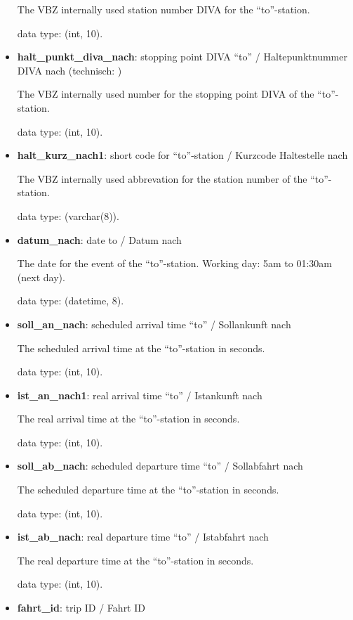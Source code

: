 \documentclass[11pt]{article}
\begin{document}
\begin{itemize}
	The VBZ internally used station number DIVA for the ``to''-station.
	
	data type: (int, 10).
	
	\item \textbf{halt\_punkt\_diva\_nach}: stopping point DIVA ``to'' / Haltepunktnummer DIVA nach (technisch: )
	
	The VBZ internally used number for the stopping point DIVA of the  ``to''-station.
	
	data type: (int, 10).
	
	\item \textbf{halt\_kurz\_nach1}: short code for ``to''-station / Kurzcode Haltestelle nach
	
	The VBZ internally used abbrevation for the station number of the ``to''-station.
	
	data type: (varchar(8)).
	
	\item \textbf{datum\_nach}: date to / Datum nach
	
	The date for the event of the  ``to''-station. Working day: 5am to 01:30am (next day).
	
	data type: (datetime, 8).
	
	\item \textbf{soll\_an\_nach}: scheduled arrival time ``to'' / Sollankunft nach
	
	The scheduled arrival time at the ``to''-station in seconds.
	
	data type: (int, 10).
	
	\item \textbf{ist\_an\_nach1}: real arrival time ``to'' / Istankunft nach
	
	The real arrival time at the ``to''-station in seconds.
	
	data type: (int, 10).
	
	\item \textbf{soll\_ab\_nach}: scheduled departure time ``to'' / Sollabfahrt nach
	
	The scheduled departure time at the ``to''-station in seconds.
	
	data type: (int, 10).
	
	\item \textbf{ist\_ab\_nach}: real departure time ``to'' / Istabfahrt nach
	
	The real departure time at the ``to''-station in seconds.
	
	data type: (int, 10).
	
	\item \textbf{fahrt\_id}: trip ID / Fahrt ID
	

\end{itemize}
\end{document}
